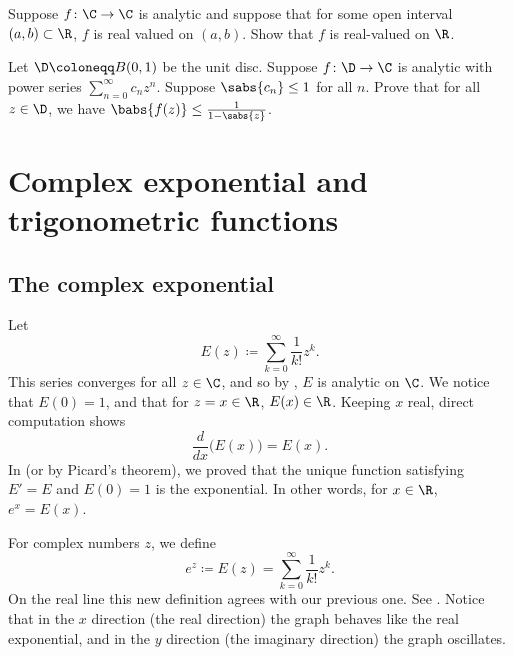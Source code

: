 \begin{exercise}
Suppose $f \colon \C \to \C$ is analytic and suppose that for some
open interval $(a,b) \subset \R$, $f$ is real valued on $(a,b)$.  Show
that $f$ is real-valued on $\R$.
\end{exercise}

\begin{exercise}
Let $\D \coloneqq B(0,1)$ be the unit disc.  Suppose
$f \colon \D \to \C$ is analytic with power series
$\sum_{n=0}^\infty c_n z^n$.  Suppose $\sabs{c_n} \leq 1$ for all $n$.  Prove that for
all $z \in \D$, we have
$\babs{f(z)} \leq \frac{1}{1-\sabs{z}}$.
\end{exercise}


\sectionnewpage
\section{Complex exponential and trigonometric functions}
\label{sec:complexexp}



\subsection{The complex exponential}

Let
\begin{equation*}
E(z) \coloneqq \sum_{k=0}^\infty \frac{1}{k!} z^k .
\end{equation*}
This series converges for all $z \in \C$, and so by
, $E$ is analytic on $\C$.   We notice that $E(0) = 1$,
and that for $z=x \in \R$, $E(x) \in \R$.  Keeping $x$ real, direct
computation shows
\begin{equation*}
\frac{d}{dx} \bigl( E(x) \bigr) = E(x) .
\end{equation*}
In  (or by Picard's theorem), we proved that
the unique function satisfying $E' = E$ and
$E(0) = 1$ is the exponential.  In other words, for $x \in \R$, $e^x = E(x)$.

For complex numbers $z$, we define
\begin{equation*}
e^z \coloneqq E(z) = 
\sum_{k=0}^\infty \frac{1}{k!} z^k .
\end{equation*}
On the real line this new definition agrees with our previous one.
See .  Notice that in the $x$ direction
(the real direction)
the graph behaves like the real exponential, and in the $y$ direction
(the imaginary direction) the graph oscillates.

